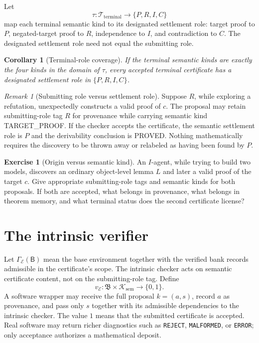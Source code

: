 \documentclass[11pt,openany]{book}
\newtheorem{corollary}[theorem]{Corollary}
\theoremstyle{definition}
\newtheorem{exercise}[theorem]{Exercise}
\theoremstyle{remark}
\newtheorem{remark}[theorem]{Remark}
\newcommand{\Bank}{\mathsf{B}}
\newcommand{\BankSpace}{\mathfrak{B}}
\newcommand{\Cert}{\mathcal{K}}
\newcommand{\Env}{\mathcal{E}}
\begin{document}
Let
\[
\tau:\mathcal T_{\mathrm{terminal}}\longrightarrow\{P,R,I,C\}
\]
map each terminal semantic kind to its designated settlement role: target proof to $P$, negated-target proof to $R$, independence to $I$, and contradiction to $C$. The designated settlement role need not equal the submitting role.

\begin{corollary}[Terminal-role coverage]\label{cor:terminalcoverage}
If the terminal semantic kinds are exactly the four kinds in the domain of $\tau$, every accepted terminal certificate has a designated settlement role in $\{P,R,I,C\}$.
\end{corollary}

\begin{remark}[Submitting role versus settlement role]
Suppose $R$, while exploring a refutation, unexpectedly constructs a valid proof of $c$. The proposal may retain submitting-role tag $R$ for provenance while carrying semantic kind \textsf{TARGET\_PROOF}. If the checker accepts the certificate, the semantic settlement role is $P$ and the derivability conclusion is \textsf{PROVED}. Nothing mathematically requires the discovery to be thrown away or relabeled as having been found by $P$.
\end{remark}

\begin{exercise}[Origin versus semantic kind]\label{ex:originkind}
An $I$-agent, while trying to build two models, discovers an ordinary object-level lemma $L$ and later a valid proof of the target $c$. Give appropriate submitting-role tags and semantic kinds for both proposals. If both are accepted, what belongs in provenance, what belongs in theorem memory, and what terminal status does the second certificate license?
\end{exercise}

\section{The intrinsic verifier}
Let $\Gamma_{\Env}(\Bank)$ mean the base environment together with the verified bank records admissible in the certificate's scope. The intrinsic checker acts on semantic certificate content, not on the submitting-role tag. Define
\[
v_{\Env}:\BankSpace\times\Cert_{\mathrm{sem}}\longrightarrow\{0,1\}.
\]
A software wrapper may receive the full proposal $k=(a,s)$, record $a$ as provenance, and pass only $s$ together with its admissible dependencies to the intrinsic checker.
The value $1$ means that the submitted certificate is accepted. Real software may return richer diagnostics such as \texttt{REJECT}, \texttt{MALFORMED}, or \texttt{ERROR}; only acceptance authorizes a mathematical deposit.
\end{document}
